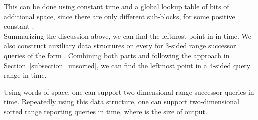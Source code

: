 \documentclass{llncs}
\begin{document}
This can be done using constant time and a global lookup table of  bits of additional space,
since there are only  different sub-blocks,
for some positive constant . \\
\indent Summarizing the discussion above, we can find the leftmost point in  in  time.
We also construct auxiliary data structures on every  for 3-sided range successor queries
of the form .
Combining both parts and following the approach in Section~\ref{subsection_unsorted},
we can find the leftmost point in a 4-sided query range in  time.
\begin{theorem}
    Using  words of space, one can support two-dimensional range successor queries in  time.
    Repeatedly using this data structure, one can support two-dimensional sorted range reporting queries in  time,
    where  is the size of output.
\end{theorem}

\begin{comment}
\section{Making it Adaptive}
\label{section_adaptive}

We can make the data structure presented in Section~\ref{section_main} adaptive at almost no cost.
We build the adaptive range counting data structure of Chan and Wilkinson~\cite{DBLP:conf/soda/ChanW13}.
This data structure supports range counting queries using  words of space and  query time,
where  is the number of points in the query range.
The key idea in their work is \emph{shallow cuttings}~\cite{DBLP:journals/comgeo/Matousek92}.
A -shallow cutting consists of  cells, each containing a subset of  points .

\cite{DBLP:journals/siamcomp/Chan00}
\end{comment}


\end{document}
